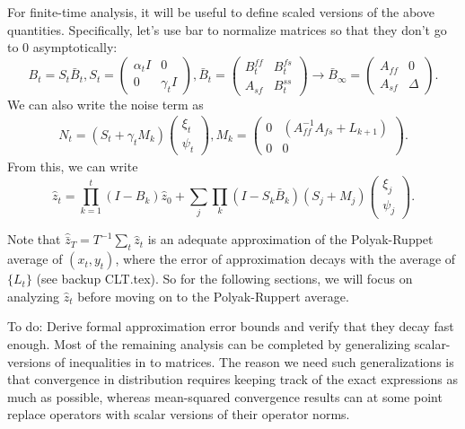 For finite-time analysis, it will be useful to define scaled versions of the above quantities.
Specifically, let's use bar to normalize matrices so that they don't go to 0 asymptotically:
\begin{equation}
    B_t = S_t \bar{B}_t, S_t = \begin{pmatrix}
        \alpha_t I & 0 \\ 0 & \gamma_t I 
    \end{pmatrix}, 
    \bar{B}_t = \begin{pmatrix}
        B_t^{ff} & B_t^{fs} \\ A_{sf} & B_t^{ss}
    \end{pmatrix} 
    \to \bar{B}_\infty = \begin{pmatrix}
        A_{ff} & 0 \\ A_{sf} & \Delta
    \end{pmatrix} .
\end{equation}
We can also write the noise term as
\begin{align*}
    N_t = \left(S_t + \gamma_t M_k
    \right) \begin{pmatrix}
        \xi_t \\ \psi_t
    \end{pmatrix},
    M_k = \begin{pmatrix}
        0 &  (A_{ff}^{-1} A_{fs} + L_{k+1}) \\ 0 & 0 
    \end{pmatrix} .
\end{align*}
From this, we can write 
\begin{equation}\label{eq:master}
    \hat{z}_t = \prod_{k=1}^t (I - B_k) \hat{z}_0 + \sum_j \prod_k \left(I - S_k \bar{B}_k\right) \left(S_j + M_j\right) \begin{pmatrix}
        \xi_j \\ \psi_j 
    \end{pmatrix} .
\end{equation}


Note that $\hat{\bar{z}}_T = T^{-1} \sum_t \hat{z}_t$ is an adequate approximation of the Polyak-Ruppet average of $(x_t, y_t)$, where the error of approximation decays with the average of $\{L_t\}$ (see backup CLT.tex).
So for the following sections, we will focus on analyzing $\hat{z}_t$ before moving on to the Polyak-Ruppert average.


{\color{blue}
To do: Derive formal approximation error bounds and verify that they decay fast enough.
Most of the remaining analysis can be completed by generalizing scalar-versions of inequalities in \citep{konda2004convergence,kaledin2020finite} to matrices. 
The reason we need such generalizations is that convergence in distribution requires keeping track of the exact expressions as much as possible, whereas mean-squared convergence results can at some point replace operators with scalar versions of their operator norms. 
}

